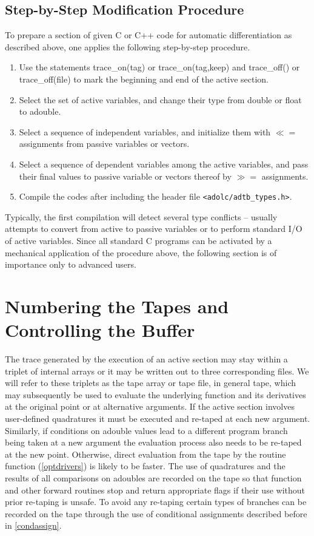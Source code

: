 \documentclass[11pt,twoside]{article}
\begin{document}
\subsection{Step-by-Step Modification Procedure}
%
To prepare a section of given C or C++ code for automatic
differentiation as described above, one applies the following step-by-step procedure.
\begin{enumerate}
\item
Use the statements {\sf trace\_on(tag)} or {\sf trace\_on(tag,keep)}
and {\sf trace\_off()} or {\sf trace\_off(file)} to mark the
beginning and end of the active section. 
\item 
Select the set of active variables, and change their type from
{\sf double} or {\sf float} to {\sf adouble}.
\item
Select a sequence of independent variables, and initialize them with
\boldmath $\ll=$ \unboldmath assignments from passive variables or vectors.
\item
Select a sequence of dependent variables among the active variables,
and pass their final values to passive variable or vectors thereof
by \boldmath $\gg=$ \unboldmath assignments.
\item 
Compile the codes after including the header file \verb=<adolc/adtb_types.h>=. 
\end{enumerate}
Typically, the first compilation will detect several type conflicts
-- usually attempts to convert from active to passive
variables or to perform standard I/O of active variables.
Since all standard
C programs can be activated by a mechanical application of the
procedure above, the following section is of importance
only to advanced users. 
%                                                                  
\section{Numbering the Tapes and Controlling the Buffer}
\label{tape}
%
The trace generated by the execution of an active section may stay
within a triplet of internal arrays or it may be written out
to three corresponding files. We will refer to these triplets as the 
tape array or tape file, in general tape, which may subsequently be
used to evaluate the 
underlying function and its derivatives at the original point or at 
alternative arguments. If the active section involves user-defined
quadratures it must be executed and
re-taped at each new argument. Similarly, if conditions on
{\sf adouble} values lead to a different program branch being taken at 
a new argument the evaluation process also needs to be re-taped at the 
new point. Otherwise, direct evaluation from
the tape by the routine {\sf function} (\autoref{optdrivers}) is 
likely to be
faster. The use of quadratures and the results of all comparisons on
{\sf adouble}s are recorded on the tape so that {\sf function} and other
forward routines stop and  return appropriate flags if their use without
prior re-taping is unsafe. To avoid any re-taping certain types of
branches can be recorded on the tape through
the use of conditional assignments  
described before in \autoref{condassign}. 
\end{document}
